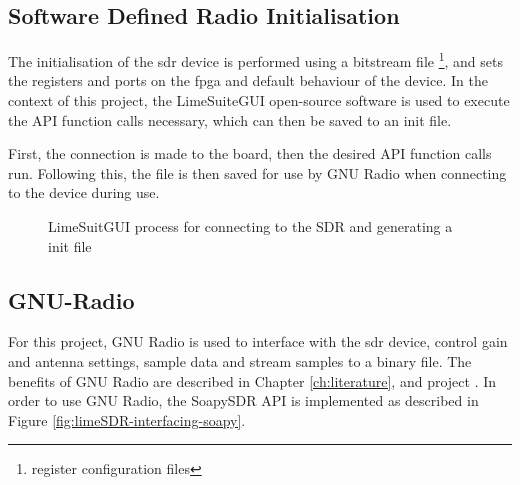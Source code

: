 \documentclass[class=report,11pt,crop=false]{standalone}
\begin{document}
\subsection{Software Defined Radio Initialisation}
The initialisation of the \gls{sdr} device is performed using a bitstream file \footnote{register configuration files}, and sets the registers and ports on the \gls{fpga} and default behaviour of the device. In the context of this project, the LimeSuiteGUI open-source software is used to execute the \gls{API} function calls necessary, which can then be saved to an init file. 

First, the connection is made to the board, then the desired \gls{API} function calls run. Following this, the file is then saved for use by GNU Radio when connecting to the device during use. 

\begin{figure}[h]\centering
    \hspace{.5cm}
    \hfill 
    \caption{LimeSuitGUI process for connecting to the SDR and generating a init file}
    \label{fig:phase-change}
\end{figure}

\subsection{GNU-Radio}
For this project, GNU Radio is used to interface with the \gls{sdr} device, control gain and antenna settings, sample data and stream samples to a binary file. The benefits of GNU Radio are described in Chapter \ref{ch:literature}, and project \cite{gnu-con17}. In order to use GNU Radio, the SoapySDR \gls{API} is implemented as described in Figure \ref{fig:limeSDR-interfacing-soapy}.
\end{document}
